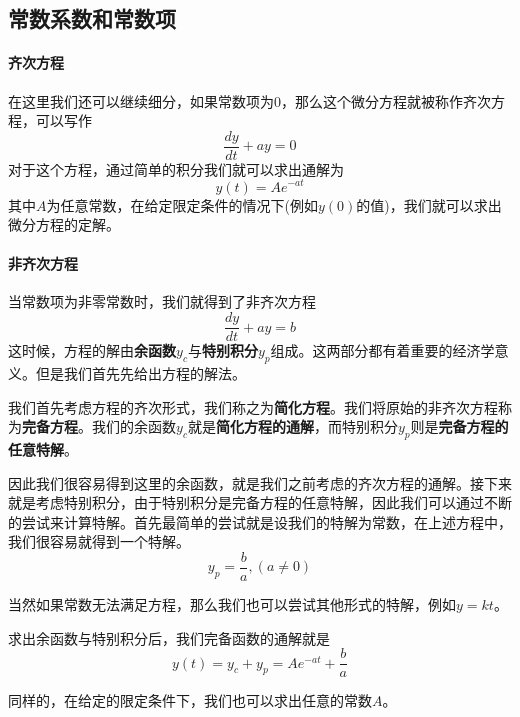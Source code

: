 \documentclass[UTF8,12pt]{ctexart}
\numberwithin{equation}{section} %
\numberwithin{figure}{section}
\numberwithin{table}{section}
\begin{document}
	\subsection{常数系数和常数项}
	
	\paragraph{齐次方程}
	在这里我们还可以继续细分，如果常数项为0，那么这个微分方程就被称作齐次方程，可以写作
	\begin{equation}
		\frac{dy}{dt} + ay = 0
	\end{equation}
	对于这个方程，通过简单的积分我们就可以求出通解为
	\begin{equation}
		y(t) = Ae^{-at}
	\end{equation}
	其中$A$为任意常数，在给定限定条件的情况下(例如$y(0)的值$)，我们就可以求出微分方程的定解。
	
	\paragraph{非齐次方程}
	当常数项为非零常数时，我们就得到了非齐次方程
	\begin{equation}
		\frac{dy}{dt} + ay = b
	\end{equation}
	这时候，方程的解由\textbf{余函数}$y_c$与\textbf{特别积分}$y_p$组成。这两部分都有着重要的经济学意义。但是我们首先先给出方程的解法。
	
	我们首先考虑方程的齐次形式，我们称之为\textbf{简化方程}。我们将原始的非齐次方程称为\textbf{完备方程}。我们的余函数$y_c$就是\textbf{简化方程的通解}，而特别积分$y_p$则是\textbf{完备方程的任意特解}。
	
	因此我们很容易得到这里的余函数，就是我们之前考虑的齐次方程的通解。接下来就是考虑特别积分，由于特别积分是完备方程的任意特解，因此我们可以通过不断的尝试来计算特解。首先最简单的尝试就是设我们的特解为常数，在上述方程中，我们很容易就得到一个特解。
	\begin{equation}
		y_p= \frac{b}{a},(a \neq 0)
	\end{equation}
	
	当然如果常数无法满足方程，那么我们也可以尝试其他形式的特解，例如$y=kt$。
	
	求出余函数与特别积分后，我们完备函数的通解就是
	\begin{equation}
		y(t) = y_c + y_p = Ae^{-at} + \frac{b}{a}
	\end{equation}

	同样的，在给定的限定条件下，我们也可以求出任意的常数$A$。
	
\end{document}
